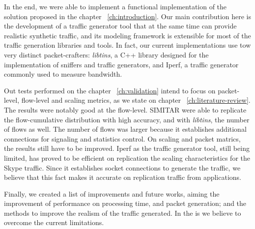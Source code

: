 In the end, we were able to implement a functional implementation of the solution proposed in the chapter ~\ref{ch:introduction}. Our main contribution here is the development of a traffic generator tool that at the same time can provide realistic synthetic traffic, and its modeling framework is extensible for most of the traffic generation libraries and tools. In fact, our current implementations use tow very distinct packet-crafters: \textit{libtins}, a C++ library designed for the implementation of sniffers and traffic generators, and Iperf, a traffic generator commonly used to measure bandwidth. 


Out tests performed on the chapter ~\ref{ch:validation} intend to focus on packet-level, flow-level and scaling metrics, as we state on chapter ~\ref{ch:literature-review}. The results were notably good at the flow-level. SIMITAR were able to replicate the flow-cumulative distribution with high accuracy, and with \textit{libtins}, the number of flows as well. The number of flows was larger because it establishes additional connections for signaling and statistics control. On scaling and packet matrics, the results still have to be improved. Iperf as the traffic generator tool, still being limited, has proved to be efficient on replication the scaling characteristics for the Skype traffic. Since it establishes socket connections to generate the traffic, we believe that this fact makes it accurate on replication traffic from applications. 


Finally, we created a list of improvements and future works, aiming the improvement of performance on processing time, and packet generation; and the methods to improve the realism of the traffic generated. In the is we believe to overcome the current limitations.





